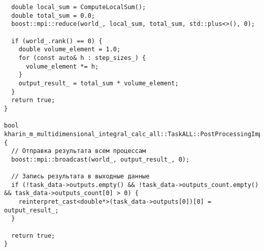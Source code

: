 \documentclass[12pt]{article}
\begin{document}
\begin{lstlisting}
  double local_sum = ComputeLocalSum();
  double total_sum = 0.0;
  boost::mpi::reduce(world_, local_sum, total_sum, std::plus<>(), 0);

  if (world_.rank() == 0) {
    double volume_element = 1.0;
    for (const auto& h : step_sizes_) {
      volume_element *= h;
    }
    output_result_ = total_sum * volume_element;
  }
  return true;
}

bool kharin_m_multidimensional_integral_calc_all::TaskALL::PostProcessingImpl() {
  // Отправка результата всем процессам
  boost::mpi::broadcast(world_, output_result_, 0);

  // Запись результата в выходные данные
  if (!task_data->outputs.empty() && !task_data->outputs_count.empty() && task_data->outputs_count[0] > 0) {
    reinterpret_cast<double*>(task_data->outputs[0])[0] = output_result_;
  }

  return true;
}
\end{lstlisting}
\end{document}

